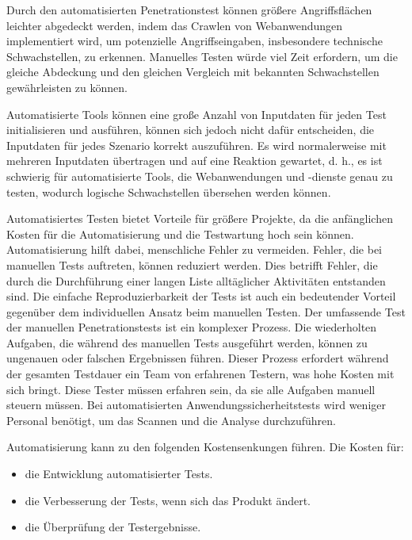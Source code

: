 Durch den automatisierten Penetrationstest können größere Angriffsflächen leichter abgedeckt werden, indem das Crawlen von Webanwendungen implementiert wird, um potenzielle Angriffseingaben, insbesondere technische Schwachstellen, zu erkennen. Manuelles Testen würde viel Zeit erfordern, um die gleiche Abdeckung und den gleichen Vergleich mit bekannten Schwachstellen gewährleisten zu können\cite{packetlabs18}.

Automatisierte Tools können eine große Anzahl von Inputdaten für jeden Test initialisieren und ausführen, können sich jedoch nicht dafür entscheiden, die Inputdaten für jedes Szenario korrekt auszuführen. Es wird normalerweise mit mehreren Inputdaten übertragen und auf eine Reaktion gewartet, d. h., es ist schwierig für automatisierte Tools, die Webanwendungen und -dienste genau zu testen, wodurch logische Schwachstellen übersehen werden können\cite{packetlabs18}.

Automatisiertes Testen bietet Vorteile für größere Projekte, da die anfänglichen Kosten für die Automatisierung und die Testwartung hoch sein können. Automatisierung hilft dabei, menschliche Fehler zu vermeiden. Fehler, die bei manuellen Tests auftreten, können reduziert werden. Dies betrifft Fehler, die durch die Durchführung einer langen Liste alltäglicher Aktivitäten entstanden sind. Die einfache Reproduzierbarkeit der Tests ist auch ein bedeutender Vorteil gegenüber dem individuellen Ansatz beim manuellen Testen. Der umfassende Test der manuellen Penetrationstests ist ein komplexer Prozess. Die wiederholten Aufgaben, die während des manuellen Tests ausgeführt werden, können zu ungenauen oder falschen Ergebnissen führen. Dieser Prozess erfordert während der gesamten Testdauer ein Team von erfahrenen Testern, was hohe Kosten mit sich bringt. Diese Tester müssen erfahren sein, da sie alle Aufgaben manuell steuern müssen. Bei automatisierten Anwendungssicherheitstests wird weniger Personal benötigt, um das Scannen und die Analyse durchzuführen\cite{autovorteil99}.

Automatisierung kann zu den folgenden Kostensenkungen führen. Die Kosten für\cite{autovorteil99}: 

\begin{itemize} 
	\item die Entwicklung automatisierter Tests.
	\item die Verbesserung der Tests, wenn sich das Produkt ändert.
	\item die Überprüfung der Testergebnisse.
\end{itemize} 

